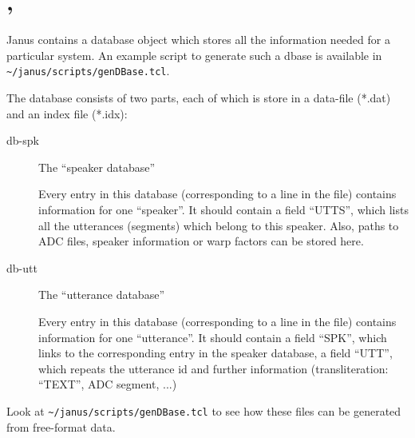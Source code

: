 







\section{, } \label{file:dbase}

Janus  contains a database   object which  stores all  the information
needed for  a particular system. An  example script to generate such a
dbase is available in \texttt{\~{ }/janus/scripts/genDBase.tcl}.

The database consists of two parts, each of which is store in a
data-file (*.dat) and an index file (*.idx):

\begin{description}
\item[db-spk] The ``speaker database''

  Every entry in  this database (corresponding to  a line in the file)
  contains information for one  ``speaker''. It should contain a field
  ``UTTS'', which lists all the  utterances (segments) which belong to
  this speaker. Also, paths to  ADC files, speaker information or warp
  factors can be stored here.

\item[db-utt] The ``utterance database''

  Every entry in this database  (corresponding to a  line in the file)
  contains  information for one   ``utterance''.  It should  contain a
  field ``SPK'', which links to the corresponding entry in the speaker
  database, a field ``UTT'', which  repeats the utterance id and further
  information (transliteration: ``TEXT'', ADC segment, ...)

\end{description}

Look at  \texttt{\~{ }/janus/scripts/genDBase.tcl} to see   how these
files can be generated from free-format data.

